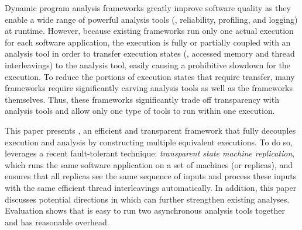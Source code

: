 
Dynamic program analysis frameworks greatly improve software quality as
they enable a wide range of powerful analysis tools (\eg, reliability,
profiling, and logging) at runtime. However, because existing frameworks run
only one actual execution for each software application, the execution is fully
or partially coupled with an analysis tool in order to transfer execution states
(\eg, accessed memory and thread interleavings) to the analysis tool, easily
causing a prohibitive slowdown for the execution. To reduce the portions of
execution states that require transfer, many frameworks require significantly
carving analysis tools as well as the frameworks themselves. Thus, these
frameworks significantly trade off transparency with analysis tools and allow
only one type of tools to run within one execution.


This paper presents \xxx, an efficient and transparent framework that fully 
decouples execution and analysis by constructing multiple equivalent 
executions. To do so, \xxx leverages a recent fault-tolerant technique: 
\emph{transparent state machine replication}, which runs the same 
software application on a set of machines (or replicas), and ensures that 
all replicas see the same sequence of inputs and process these inputs with 
the same efficient thread interleavings automatically. In addition, this paper 
discusses potential directions in which \xxx can further strengthen existing 
analyses. Evaluation shows that \xxx is easy to run two asynchronous 
analysis tools together and has reasonable overhead.
